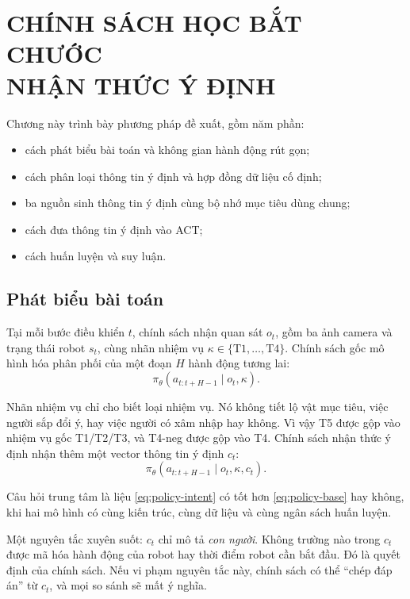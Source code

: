 \chapter[CHÍNH SÁCH HỌC BẮT CHƯỚC NHẬN THỨC Ý ĐỊNH]{CHÍNH SÁCH HỌC BẮT CHƯỚC\\NHẬN THỨC Ý ĐỊNH}
\label{chap:method}

Chương này trình bày phương pháp đề xuất, gồm năm phần:
\begin{itemize}
  \item cách phát biểu bài toán và không gian hành động rút gọn;
  \item cách phân loại thông tin ý định và hợp đồng dữ liệu cố định;
  \item ba nguồn sinh thông tin ý định cùng bộ nhớ mục tiêu dùng chung;
  \item cách đưa thông tin ý định vào ACT;
  \item cách huấn luyện và suy luận.
\end{itemize}

\section{Phát biểu bài toán}
\label{sec:formulation}

Tại mỗi bước điều khiển $t$, chính sách nhận quan sát $o_t$, gồm ba ảnh camera và trạng thái robot $s_t$, cùng nhãn nhiệm vụ $\kappa \in \{\text{T1},\ldots,\text{T4}\}$. Chính sách gốc mô hình hóa phân phối của một đoạn $H$ hành động tương lai:
\begin{equation}
  \pi_\theta\left(a_{t:t+H-1} \mid o_t, \kappa\right).
  \label{eq:policy-base}
\end{equation}

Nhãn nhiệm vụ chỉ cho biết loại nhiệm vụ. Nó không tiết lộ vật mục tiêu, việc người sắp đổi ý, hay việc người có xâm nhập hay không. Vì vậy T5 được gộp vào nhiệm vụ gốc T1/T2/T3, và T4-neg được gộp vào T4. Chính sách nhận thức ý định nhận thêm một vector thông tin ý định $c_t$:
\begin{equation}
  \pi_\theta\left(a_{t:t+H-1} \mid o_t, \kappa, c_t\right).
  \label{eq:policy-intent}
\end{equation}

Câu hỏi trung tâm là liệu \eqref{eq:policy-intent} có tốt hơn \eqref{eq:policy-base} hay không, khi hai mô hình có cùng kiến trúc, cùng dữ liệu và cùng ngân sách huấn luyện.

Một nguyên tắc xuyên suốt: $c_t$ chỉ mô tả \emph{con người}. Không trường nào trong $c_t$ được mã hóa hành động của robot hay thời điểm robot cần bắt đầu. Đó là quyết định của chính sách. Nếu vi phạm nguyên tắc này, chính sách có thể ``chép đáp án'' từ $c_t$, và mọi so sánh sẽ mất ý nghĩa.

